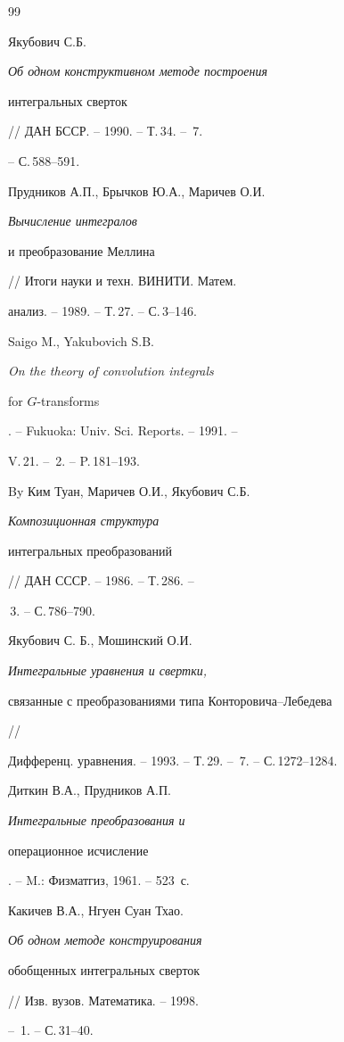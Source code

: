 \begin{thebibliography}{99} 


 




Якубович С.Б. {\em Об одном конструктивном методе построения 


интегральных сверток} // ДАН БССР. -- 1990. -- Т.\,34. -- \No\,7. 


-- С.\,588--591. 




Прудников А.П., Брычков Ю.А., Маричев О.И. {\em Вычисление интегралов 


и преобразование Меллина} // Итоги науки и техн. ВИНИТИ. Матем. 


анализ. -- 1989. -- Т.\,27. -- С.\,3--146. 




Saigo M., Yakubovich S.B. {\em On the theory of convolution integrals 


for $G$-transforms}. -- Fukuoka: Univ. Sci. Reports. -- 1991. -- 


V.\,21. -- \No\,2. -- P.\,181--193. 




By Ким Туан, Маричев О.И., Якубович С.Б. {\em Композиционная структура 


интегральных преобразований} // ДАН СССР. -- 1986. -- Т.\,286. -- 


\No\,3. -- С.\,786--790. 




Якубович С. Б., Мошинский О.И. {\em Интегральные уравнения и свертки, 


связанные с преобразованиями типа Конторовича--Лебедева} // 


Дифференц. уравнения. -- 1993. -- Т.\,29. -- \No\,7. -- С.\,1272--1284. 




Диткин В.А., Прудников А.П. {\em Интегральные преобразования и 


операционное исчисление}. -- M.: Физматгиз, 1961. -- 523~с. 




Какичев В.А., Нгуен Суан Тхао. {\em Об одном методе конструирования 


обобщенных интегральных сверток} // Изв. вузов. Математика. -- 1998. 


-- \No\,1. -- С.\,31--40. 





\end{thebibliography}
